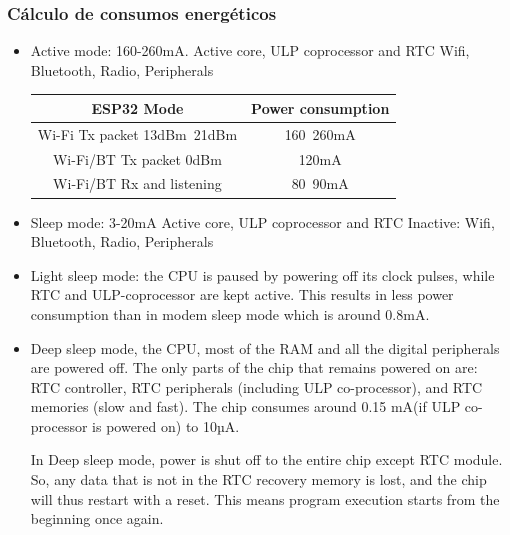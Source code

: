 \documentclass[a4paper ,12pt, onecolumn]{article}
\begin{document}
        \subsubsection{Cálculo de consumos energéticos}
            \begin{itemize}
                \item  Active mode: 160-260mA.  Active core, ULP coprocessor and RTC
                Wifi, Bluetooth, Radio, Peripherals
                \begin{center}
                    \begin{tabular}{||c || c ||} 
                    \hline
                    ESP32 Mode & Power consumption  \\ [0.5ex] 
                    \hline\hline
                    Wi-Fi Tx packet 13dBm~21dBm & 160~260mA  \\ 
                    \hline
                    Wi-Fi/BT Tx packet 0dBm	 & 120mA  \\
                    \hline
                    Wi-Fi/BT Rx and listening & 80~90mA  \\
                    \hline
                \end{tabular}
                \end{center}
                \item  Sleep mode: 3-20mA Active core, ULP coprocessor and RTC
                Inactive: Wifi, Bluetooth, Radio, Peripherals
                \item  Light sleep mode: the CPU is paused by powering off its clock 
                pulses, while RTC and ULP-coprocessor are kept active. This results in 
                less power consumption than in modem sleep mode which is around 0.8mA.
            
                \item Deep sleep mode, the CPU, most of the RAM and all the digital 
                peripherals are powered off. The only parts of the chip that remains 
                powered on are: RTC controller, RTC peripherals (including ULP 
                co-processor), and RTC memories (slow and fast).
                The chip consumes around 0.15 mA(if ULP co-processor is powered on) to 10µA.
            
                In Deep sleep mode, power is shut off to the entire chip except RTC module. So, any data that is not in the RTC recovery memory is lost, and the chip will thus restart with a reset. This means program execution starts from the beginning once again.
            

\end{itemize}
\end{document}
